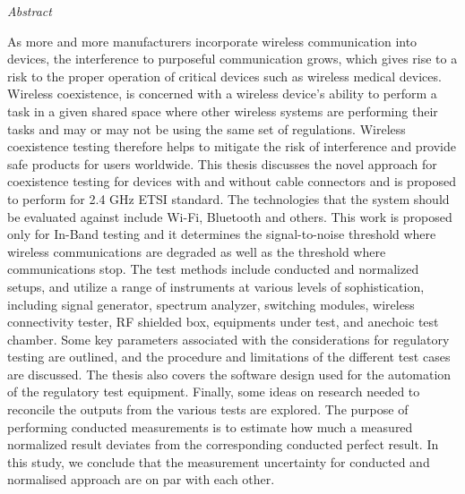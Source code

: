 

\newpage
\thispagestyle{empty}
\begin{center}
\Huge\emph{Abstract}
\end{center}
\medskip
\noindent As more and more manufacturers incorporate wireless communication into devices, the interference to purposeful communication grows, which gives rise to a risk to the proper operation of critical devices such as wireless medical devices. Wireless coexistence, is concerned with a wireless device's ability to perform a task in a given shared space where other wireless systems are performing their tasks and may or may not be using the same set of regulations. Wireless coexistence testing therefore helps to mitigate the risk of interference and provide safe products for users worldwide. This thesis discusses the novel approach for coexistence testing for devices with and without cable connectors and is proposed to perform for 2.4 GHz ETSI standard. The technologies that the system should be evaluated against include Wi-Fi\texttrademark{}, Bluetooth\textregistered{} and others. This work is proposed only for In-Band testing and it determines the signal-to-noise threshold where wireless communications are degraded as well as the threshold where communications stop. The test methods include conducted and normalized setups, and utilize a range of instruments at various levels of sophistication, including signal generator, spectrum analyzer, switching modules, wireless connectivity tester, RF shielded box, equipments under test, and anechoic test chamber. Some key parameters associated with the considerations for regulatory testing are outlined, and the procedure and limitations of the different test cases are discussed. The thesis also covers the software design used for the automation of the regulatory test equipment. Finally, some ideas on research needed to reconcile the outputs from the various tests are explored. The purpose of performing conducted measurements is to estimate how much a measured normalized result deviates from the corresponding conducted perfect result. In this study, we conclude that the measurement uncertainty for conducted and normalised approach are on par with each other. 










